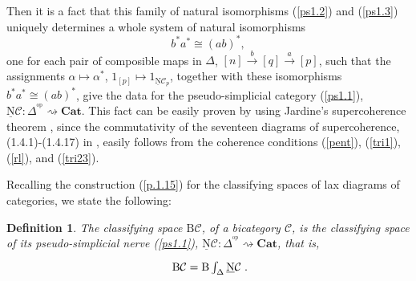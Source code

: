 \documentclass[]{amsart}
\newtheorem{definition}[theorem]{Definition}
\begin{document}
Then it is a fact that this family of natural isomorphisms (\ref{ps1.2}) and (\ref{ps1.3}) uniquely
determines a whole system of natural isomorphisms $$ b^*a^*\cong (ab)^*,$$ one for each pair of
composible maps in $\Delta$, $[n]\overset{b}\to [q]\overset{a}\to [p]$, such that the assignments
$\alpha\mapsto \alpha^*$, $1_{[p]}\mapsto 1_{{\ensuremath{\underline{\mathrm{N}}}}{\ensuremath{\mathcal{C}}}_p}$, together with these isomorphisms
$b^*a^*\cong (ab)^*$, give the data for the pseudo-simplicial category (\ref{ps1.1}),
${\ensuremath{\underline{\mathrm{N}}}}{\ensuremath{\mathcal{C}}}:\Delta^{\!^{\mathrm{op}}}\rightsquigarrow{\ensuremath{\mathbf{Cat}}}$. This fact can be easily proven by using
Jardine's supercoherence theorem \cite[Corollary 1.6]{jardine}, since the commutativity of the
seventeen diagrams of supercoherence, (1.4.1)-(1.4.17) in \cite{jardine},
 easily follows from the coherence conditions (\ref{pent}),  (\ref{tri1}),  (\ref{rl}), and  (\ref{tri23}).

Recalling the construction (\ref{p.1.15}) for the classifying spaces of lax diagrams of categories,
we state the following:

\begin{definition}\label{ps1.5}
The classifying space ${\ensuremath{\mathrm{B}}}{\ensuremath{\mathcal{C}}}$, of a bicategory ${\ensuremath{\mathcal{C}}}$, is the classifying space of its
pseudo-simplicial nerve {\em (\ref{ps1.1})}, ${\ensuremath{\underline{\mathrm{N}}}}{\ensuremath{\mathcal{C}}}:\Delta^{\!^{\mathrm{op}}}\rightsquigarrow
{\ensuremath{\mathbf{Cat}}}$, that is,
\begin{equation}\label{ps1.6} \xymatrix{{\ensuremath{\mathrm{B}}}{\ensuremath{\mathcal{C}}}={\ensuremath{\mathrm{B}}}\int_\Delta {\ensuremath{\underline{\mathrm{N}}}}{\ensuremath{\mathcal{C}}}}.
\end{equation}
\end{definition}
\end{document}
